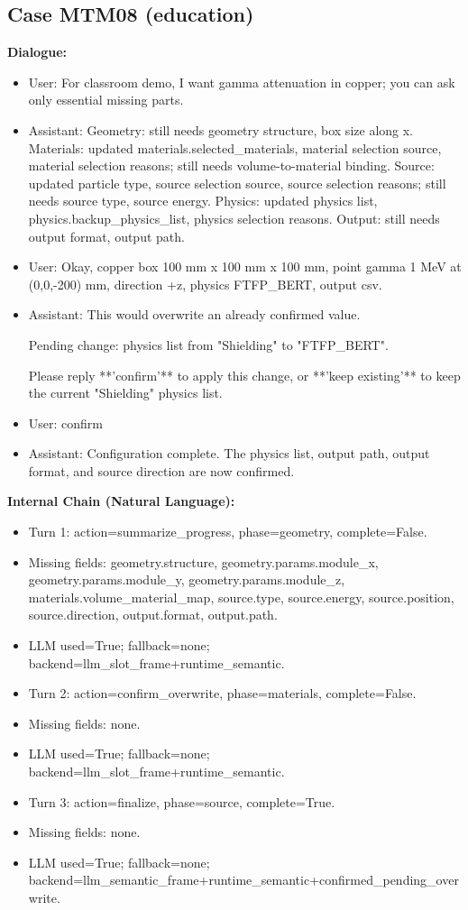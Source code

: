 \documentclass[11pt]{ctexart}
\begin{document}
\subsection{Case MTM08 (education)}
\textbf{Dialogue:}
\begin{itemize}
\item User: For classroom demo, I want gamma attenuation in copper; you can ask only essential missing parts.
\item Assistant: Geometry: still needs geometry structure, box size along x. Materials: updated materials.selected\_materials, material selection source, material selection reasons; still needs volume-to-material binding. Source: updated particle type, source selection source, source selection reasons; still needs source type, source energy. Physics: updated physics list, physics.backup\_physics\_list, physics selection reasons. Output: still needs output format, output path.
\item User: Okay, copper box 100 mm x 100 mm x 100 mm, point gamma 1 MeV at (0,0,-200) mm, direction +z, physics FTFP\_BERT, output csv.
\item Assistant: This would overwrite an already confirmed value.

Pending change: physics list from "Shielding" to "FTFP\_BERT".

Please reply **'confirm'** to apply this change, or **'keep existing'** to keep the current "Shielding" physics list.
\item User: confirm
\item Assistant: Configuration complete. The physics list, output path, output format, and source direction are now confirmed.
\end{itemize}
\textbf{Internal Chain (Natural Language):}
\begin{itemize}
\item Turn 1: action=summarize\_progress, phase=geometry, complete=False.
\item Missing fields: geometry.structure, geometry.params.module\_x, geometry.params.module\_y, geometry.params.module\_z, materials.volume\_material\_map, source.type, source.energy, source.position, source.direction, output.format, output.path.
\item LLM used=True; fallback=none; backend=llm\_slot\_frame+runtime\_semantic.
\item Turn 2: action=confirm\_overwrite, phase=materials, complete=False.
\item Missing fields: none.
\item LLM used=True; fallback=none; backend=llm\_slot\_frame+runtime\_semantic.
\item Turn 3: action=finalize, phase=source, complete=True.
\item Missing fields: none.
\item LLM used=True; fallback=none; backend=llm\_semantic\_frame+runtime\_semantic+confirmed\_pending\_overwrite.
\end{itemize}
\end{document}
